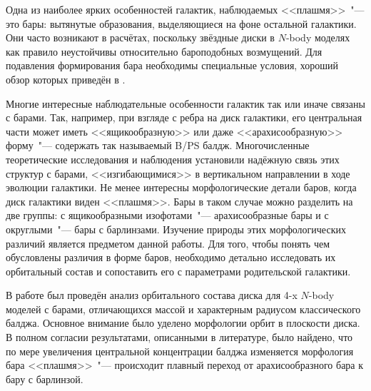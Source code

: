 \documentclass{trlnotes}
\begin{document}
Одна из наиболее ярких особенностей галактик, наблюдаемых <<плашмя>>~"--- это бары:
вытянутые образования, выделяющиеся на фоне остальной галактики.
Они часто возникают в расчётах, поскольку звёздные диски в $N$-body моделях 
как правило неустойчивы относительно бароподобных возмущений.
 Для подавления формирования бара необходимы специальные условия, хороший обзор которых приведён 
в \citet{sellwood2019}.

Многие интересные наблюдательные особенности галактик так или иначе связаны с барами. 
Так, например, при взгляде с ребра на диск галактики, его центральная части может иметь 
<<ящикообразную>> или даже <<арахисообразную>> форму~"--- содержать так называемый B/PS балдж. 
Многочисленные теоретические исследования и наблюдения установили надёжную связь этих структур с барами, <<изгибающимися>> в вертикальном направлении в ходе эволюции галактики.
Не менее интересны морфологические детали баров, когда диск галактики виден <<плашмя>>. Бары в таком случае можно разделить на две 
группы: с ящикообразными изофотами~"--- арахисообразные бары и с округлыми~"--- бары с барлинзами. 
Изучение природы этих морфологических различий является предметом данной работы.
Для того, чтобы понять чем обусловлены различия в форме баров, необходимо детально исследовать их орбитальный состав
и сопоставить его с параметрами родительской галактики.

В работе был проведён анализ орбитального состава диска для 4-x $N$-body моделей с барами,
отличающихся массой и характерным радиусом классического балджа. Основное внимание было уделено морфологии орбит в плоскости диска. 
В полном согласии результатами, описанными в литературе, было найдено, что по мере увеличения центральной концентрации балджа 
изменяется морфология бара <<плашмя>>~"--- происходит плавный переход от арахисообразного бара к бару с барлинзой.
\end{document}
